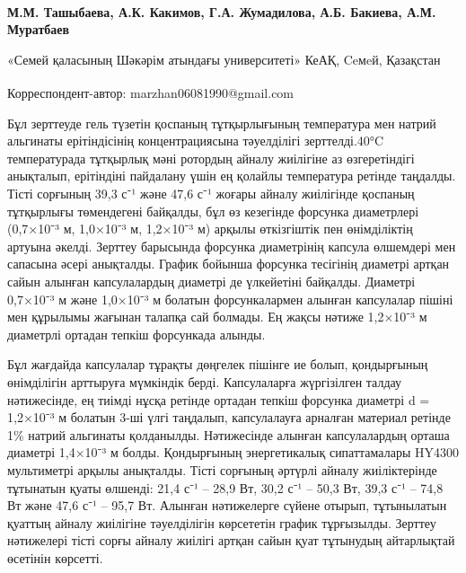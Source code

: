 
\begin{articleheader}

{\bfseries
М.М. Ташыбаева\textsuperscript{\envelope },
А.К. Какимов,
Г.А. Жумадилова,
А.Б. Бакиева,
А.М. Муратбаев
}
\end{articleheader}

\begin{affiliation}
«Семей қаласының Шәкәрім атындағы университеті» КеАҚ, Ceмeй, Қазақстан
\vspace{0.5em}

\raggedright \textsuperscript{\envelope }Корреспондент-автор: marzhan06081990@gmail.com
\end{affiliation}

Бұл зерттеуде гель түзетін қоспаның тұтқырлығының температура мен натрий
альгинаты ерітіндісінің концентрациясына тәуелділігі зерттелді.40°C
температурада тұтқырлық мәні ротордың айналу жиілігіне аз өзгеретіндігі
анықталып, ерітіндіні пайдалану үшін ең қолайлы температура ретінде
таңдалды. Тісті сорғының 39,3 с⁻¹ және 47,6 с⁻¹ жоғары айналу жиілігінде
қоспаның тұтқырлығы төмендегені байқалды, бұл өз кезегінде форсунка
диаметрлері (0,7×10⁻³ м, 1,0×10⁻³ м, 1,2×10⁻³ м) арқылы өткізгіштік пен
өнімділіктің артуына әкелді. Зерттеу барысында форсунка диаметрінің
капсула өлшемдері мен сапасына әсері анықталды. График бойынша форсунка
тесігінің диаметрі артқан сайын алынған капсулалардың диаметрі де
үлкейетіні байқалды. Диаметрі 0,7×10⁻³ м және 1,0×10⁻³ м болатын
форсункалармен алынған капсулалар пішіні мен құрылымы жағынан талапқа
сай болмады. Ең жақсы нәтиже 1,2×10⁻³ м диаметрлі ортадан тепкіш
форсункада алынды.

Бұл жағдайда капсулалар тұрақты дөңгелек пішінге ие болып, қондырғының
өнімділігін арттыруға мүмкіндік берді. Капсулаларға жүргізілген талдау
нәтижесінде, ең тиімді нұсқа ретінде ортадан тепкіш форсунка диаметрі d
= 1,2×10⁻³ м болатын 3-ші үлгі таңдалып, капсулалауға арналған материал
ретінде 1\% натрий альгинаты қолданылды. Нәтижесінде алынған
капсулалардың орташа диаметрі 1,4×10⁻³ м болды. Қондырғының
энергетикалық сипаттамалары HY4300 мультиметрі арқылы анықталды. Тісті
сорғының әртүрлі айналу жиіліктерінде тұтынатын қуаты өлшенді: 21,4 с⁻¹
-- 28,9 Вт, 30,2 с⁻¹ -- 50,3 Вт, 39,3 с⁻¹ -- 74,8 Вт және 47,6 с⁻¹ --
95,7 Вт. Алынған нәтижелерге сүйене отырып, тұтынылатын қуаттың айналу
жиілігіне тәуелділігін көрсететін график тұрғызылды. Зерттеу нәтижелері
тісті сорғы айналу жиілігі артқан сайын қуат тұтынудың айтарлықтай
өсетінін көрсетті.

